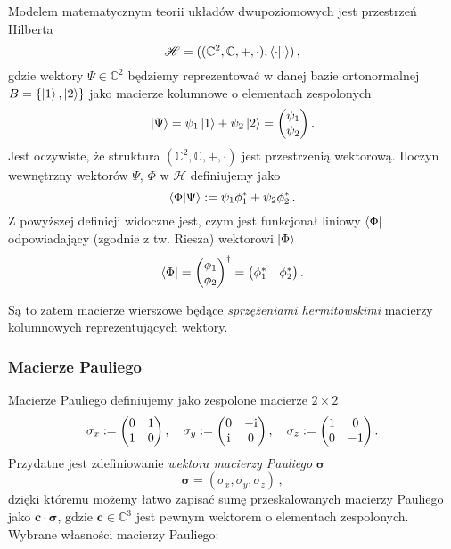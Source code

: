 \documentclass{myclass}
\begin{document}
Modelem matematycznym teorii układów dwupoziomowych jest przestrzeń Hilberta
\begin{equation*}
    \mathscr{H} = ((\mathbb{C}^2,\mathbb{C},+,\cdot), \braket{\cdot})\,,
\end{equation*}
gdzie wektory \(\Psi\in\mathbb{C}^2\) będziemy reprezentować w danej bazie ortonormalnej
\(B=\{\ket{1},\ket{2}\}\) jako macierze kolumnowe o elementach zespolonych
\begin{equation*}
    \ket{\Psi} = \psi_1\ket{1} + \psi_2\ket{2} = \mqty(\psi_1 \\ \psi_2)\,.
\end{equation*}
Jest oczywiste, że struktura \((\mathbb{C}^2,\mathbb{C},+,\cdot)\) jest przestrzenią wektorową.
Iloczyn wewnętrzny wektorów \(\Psi\), \(\Phi\) w \(\mathscr{H}\) definiujemy jako
\begin{equation*}
    \braket{\Phi}{\Psi} := \psi_1\phi_1^* + \psi_2\phi_2^*\,.
\end{equation*}
Z powyższej definicji widoczne jest, czym jest funkcjonał liniowy \(\bra{\Phi}\) odpowiadający
(zgodnie z tw. Riesza) wektorowi \(\ket{\Phi}\)
\begin{equation*}
    \bra{\Phi} = \mqty(\phi_1 \\ \phi_2)^\dagger = \mqty(\phi_1^* & \phi_2^*)\,.
\end{equation*}

Są to zatem macierze wierszowe będące \textit{sprzężeniami hermitowskimi} macierzy kolumnowych
reprezentujących wektory.

\subsubsection{Macierze Pauliego}

Macierze Pauliego definiujemy jako zespolone macierze \(2\times 2\)
\begin{equation*}
    \sigma_x := \mqty(0 & 1 \\ 1 & 0)\,,\quad \sigma_y := \mqty(0 & -\im \\ \im & 0)\,,\quad \sigma_z := \mqty(1 & 0 \\ 0 & -1)\,.
\end{equation*}
Przydatne jest zdefiniowanie \textit{wektora macierzy Pauliego} \(\boldsymbol{\sigma}\)
\begin{equation*}
    \boldsymbol{\sigma} = (\sigma_x, \sigma_y, \sigma_z)\,,
\end{equation*}
dzięki któremu możemy łatwo zapisać sumę przeskalowanych macierzy Pauliego jako
\(\mathbf{c}\cdot\boldsymbol{\sigma}\), gdzie \(\mathbf{c}\in\mathbb{C}^3\) jest pewnym wektorem o
elementach zespolonych. Wybrane własności macierzy Pauliego:
\end{document}
